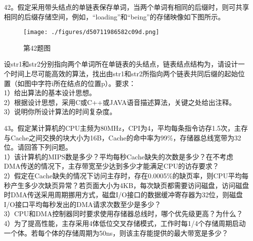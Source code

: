 42。假定采用带头结点的单链表保存单词，当两个单词有相同的后缀时，则可共享相同的后缀存储空间，例如，“loading”和“being”的存储映像如下图所示。\\
\begin{figure}[ht]
\centering
\texttt{[image: ./figures/d50711986582c09d.png]}
\caption{第42题图} \label{fig_CSN12_4}
\end{figure}
设str1和str2分别指向两个单词所在单链表的头结点，链表结点结构为，请设计一个时间上尽可能高效的算法，找出由str1和str2所指向两个链表共同后缀的起始位置（如图中字符i所在结点的位置p）。要求：\\
1）给出算法的基本设计思想。\\
2）根据设计思想，采用C或C++或JAVA语音描述算法，关键之处给出注释。\\
3）说明你所设计算法的时间复杂度。

43。假定某计算机的CPU主频为80MHz，CPI为4，平均每条指令访存1.5次，主存与Cache之间交换的块大小为16B，Cache的命中率为99\%，存储器总线宽带为32位。请回答下列问题。\\
1）该计算机的MIPS数是多少？平均每秒Cache缺失的次数是多少？在不考虑DMA传送的情况下，主存带宽至少达到多少才能满足CPU的访存要求？\\
2）假定在Cache缺失的情况下访问主存时，存在0.0005\%的缺页率，则CPU平均每秒产生多少次缺页异常？若页面大小为4KB，每次缺页都需要访问磁盘，访问磁盘时DMA传送采用周期挪用方式，磁盘I/O接口的数据缓冲寄存器为32位，则磁盘I/O接口平均每秒发出的DMA请求次数至少是多少？\\
3）CPU和DMA控制器同时要求使用存储器总线时，哪个优先级更高？为什么？\\
4）为了提高性能，主存采用4体低位交叉存储模式，工作时每1/4个存储周期启动一个体。若每个体的存储周期为50ns，则该主存能提供的最大带宽是多少？

